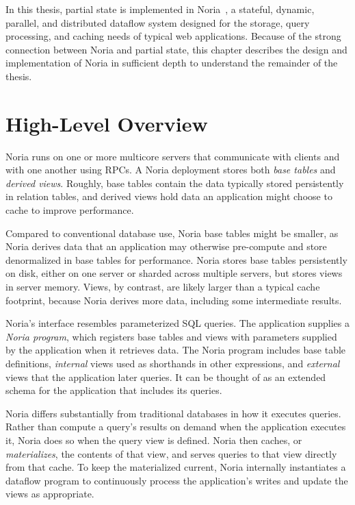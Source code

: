 In this thesis, partial state is implemented in Noria~\cite{noria}, a stateful,
dynamic, parallel, and distributed dataflow system designed for the storage,
query processing, and caching needs of typical web applications. Because of the
strong connection between Noria and partial state, this chapter describes the
design and implementation of Noria in sufficient depth to understand the
remainder of the thesis.

\section{High-Level Overview}

Noria runs on one or more multicore servers that communicate with clients and
with one another using RPCs. A Noria deployment stores both \emph{base tables}
and \emph{derived views}. Roughly, base tables contain the data typically stored
persistently in relation tables, and derived views hold data an application
might choose to cache to improve performance.

Compared to conventional database use, Noria base tables might be smaller, as
Noria derives data that an application may otherwise pre-compute and store
denormalized in base tables for performance. Noria stores base tables
persistently on disk, either on one server or sharded across multiple servers,
but stores views in server memory. Views, by contrast, are likely larger than a
typical cache footprint, because Noria derives more data, including some
intermediate results.

Noria's interface resembles parameterized SQL queries. The application supplies
a \emph{Noria program}, which registers base tables and views with parameters
supplied by the application when it retrieves data. The Noria program includes
base table definitions, \emph{internal} views used as shorthands in other
expressions, and \emph{external} views that the application later queries. It
can be thought of as an extended schema for the application that includes its
queries.

Noria differs substantially from traditional databases in how it executes
queries. Rather than compute a query's results on demand when the application
executes it, Noria does so when the query view is defined. Noria then caches, or
\emph{materializes}, the contents of that view, and serves queries to that view
directly from that cache. To keep the materialized current, Noria internally
instantiates a dataflow program to continuously process the application's writes
and update the views as appropriate.

